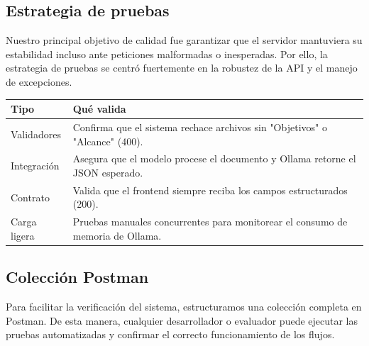 

\subsection{Estrategia de pruebas}

Nuestro principal objetivo de calidad fue garantizar que el servidor mantuviera su estabilidad incluso ante peticiones malformadas o inesperadas. Por ello, la estrategia de pruebas se centró fuertemente en la robustez de la API y el manejo de excepciones.

\begin{tabular}{@{}lp{9.5cm}@{}}
  \toprule
  Tipo & Qué valida \\
  \midrule
  Validadores & Confirma que el sistema rechace archivos sin "Objetivos" o "Alcance" (400). \\
  Integración & Asegura que el modelo procese el documento y Ollama retorne el JSON esperado. \\
  Contrato & Valida que el frontend siempre reciba los campos estructurados (200). \\
  Carga ligera & Pruebas manuales concurrentes para monitorear el consumo de memoria de Ollama. \\
  \bottomrule
\end{tabular}

\subsection{Colección Postman}

Para facilitar la verificación del sistema, estructuramos una colección completa en Postman. De esta manera, cualquier desarrollador o evaluador puede ejecutar las pruebas automatizadas y confirmar el correcto funcionamiento de los flujos.

